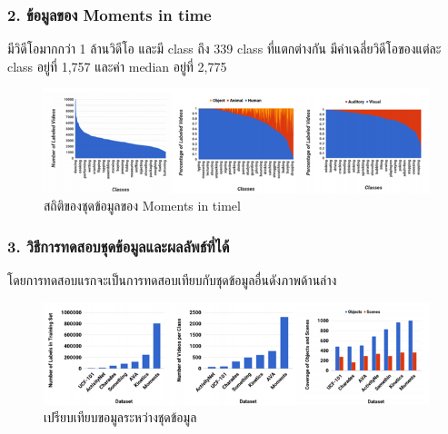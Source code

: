 \subsubsection*{2. ข้อมูลของ Moments in time}
มีวิดีโอมากกว่า 1 ล้านวิดีโอ และมี class ถึง 339 class ที่แตกต่างกัน มีค่าเฉลี่ยวิดีโอของแต่ละ class อยู่ที่ 1,757 และค่า median อยู่ที่ 2,775

\begin{figure}[!ht]
	\centering
	\includegraphics[width=1\textwidth]{chapter2/images/statistic_moment.png}
		\caption{สถิติของชุดข้อมูลของ Moments in timel}
    	\label{fig:statistic_moment}
\end{figure}
\subsubsection*{3. วิธีการทดสอบชุดข้อมูลและผลลัพธ์ที่ได้}
โดยการทดสอบแรกจะเป็นการทดสอบเทียบกับชุดข้อมูลอื่นดังภาพด้านล่าง

\begin{figure}[!ht]
	\centering
	\includegraphics[width=1\textwidth]{chapter2/images/compare_dataset.png}
		\caption{เปรียบเทียบขอมูลระหว่างชุดข้อมูล}
    	\label{fig:compare_dataset}
\end{figure}

